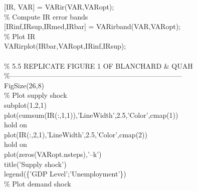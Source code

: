 \hspace{1mm}[IR, VAR] = VARir(VAR,VARopt); \\ 
\hspace{1mm}\textcolor{matlabgreen}{\% Compute IR error bands }\\ 
\hspace{1mm}[IRinf,IRsup,IRmed,IRbar] = VARirband(VAR,VARopt); \\ 
\hspace{1mm}\textcolor{matlabgreen}{\% Plot IR }\\ 
\hspace{1mm}VARirplot(IRbar,VARopt,IRinf,IRsup); \\ 
\hspace{1mm} \\ 
\hspace{1mm}\textcolor{matlabgreen}{\% 5.5 REPLICATE FIGURE 1 OF BLANCHARD \& QUAH }\\ 
\hspace{1mm}\textcolor{matlabgreen}{\%--------------------------------------------------------------------------  }\\ 
\hspace{1mm}FigSize(26,8) \\ 
\hspace{1mm}\textcolor{matlabgreen}{\% Plot supply shock }\\ 
\hspace{1mm}subplot(1,2,1) \\ 
\hspace{1mm}plot(cumsum(IR(:,1,1)),\textcolor{matlabpurple}{'LineWidth'},2.5,\textcolor{matlabpurple}{'Color'},cmap(1)) \\ 
\hspace{1mm}hold on \\ 
\hspace{1mm}plot(IR(:,2,1),\textcolor{matlabpurple}{'LineWidth'},2.5,\textcolor{matlabpurple}{'Color'},cmap(2)) \\ 
\hspace{1mm}hold on \\ 
\hspace{1mm}plot(zeros(VARopt.nsteps),\textcolor{matlabpurple}{'--k'}) \\ 
\hspace{1mm}title(\textcolor{matlabpurple}{'Supply shock'}) \\ 
\hspace{1mm}legend(\{\textcolor{matlabpurple}{'GDP Level'};'Unemployment'\}) \\ 
\hspace{1mm}\textcolor{matlabgreen}{\% Plot demand shock }\\ 
